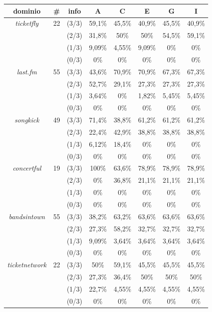 \documentclass[a4paper]{report}
\begin{document}
\begin{tabular}{|cccccccc|}
\hline
dominio & \# & info & A & C & E & G & I \\
\hline
\textit{ticketfly} &22& (3/3) & 59,1\%& 45,5\%& 40,9\%& 45,5\%& 40,9\% \\
& & (2/3) & 31,8\%& 50\%& 50\%& 54,5\%& 59,1\% \\
& & (1/3) & 9,09\%&4,55\%& 9,09\%& 0\%& 0\% \\
& & (0/3) & 0\%& 0\%& 0\%& 0\%& 0\% \\
\hline
\textit{last.fm} &55& (3/3) & 43,6\%& 70,9\%& 70,9\%& 67,3\%& 67,3\%\\ 
 & & (2/3) & 52,7\%& 29,1\%& 27,3\%& 27,3\%& 27,3\% \\
 & & (1/3) & 3,64\%& 0\%& 1,82\%& 5,45\%& 5,45\% \\
 & & (0/3) & 0\%& 0\%& 0\%& 0\%& 0\% \\
\hline
\textit{songkick} &49& (3/3) & 71,4\%& 38,8\%& 61,2\%& 61,2\%& 61,2\%\\
 & & (2/3) & 22,4\%& 42,9\%& 38,8\%& 38,8\%& 38,8\%\\
 & & (1/3) & 6,12\%& 18,4\%& 0\%& 0\%& 0\%\\
 & & (0/3) & 0\%& 0\%& 0\%& 0\%& 0\%\\
\hline

\textit{concertful} &19& (3/3) & 100\%& 63,6\%& 78,9\%& 78,9\%& 78,9\% \\
& & (2/3) & 0\%& 36,8\%& 21,1\%& 21,1\%& 21,1\% \\
& & (1/3) & 0\%& 0\%& 0\%& 0\%& 0\% \\
& & (0/3) & 0\%& 0\%& 0\%& 0\%& 0\% \\
\hline
\textit{bandsintown} &55& (3/3) & 38,2\%& 63,2\%& 63,6\%& 63,6\%& 63,6\% \\
& & (2/3) & 27,3\%& 58,2\%& 32,7\%& 32,7\%& 32,7\% \\
& & (1/3) & 9,09\%& 3,64\%& 3,64\%& 3,64\%& 3,64\% \\
& & (0/3) & 0\%& 0\%& 0\%& 0\%& 0\% \\
\hline
\textit{ticketnetwork} &22& (3/3) & 50\%& 59,1\%& 45,5\%& 45,5\%& 45,5\% \\
& & (2/3) & 27,3\%& 36,4\%& 50\%& 50\%& 50\% \\
& & (1/3) & 22,7\%& 4,55\%& 4,55\%& 4,55\%& 4,55\% \\
& & (0/3) & 0\%& 0\%& 0\%& 0\%& 0\% \\
\hline
\end{tabular}
\end{document}
